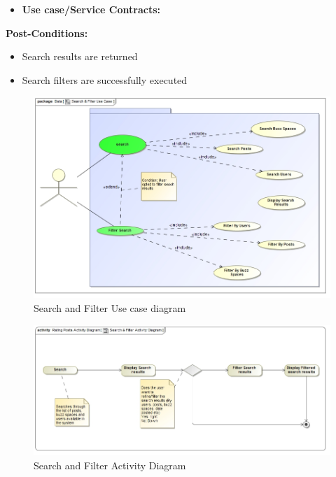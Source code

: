 \documentclass[11pt]{article}
\begin{document}
\begin{enumerate}
\begin{itemize}
\item \textbf{Use case/Service Contracts: } \newline \newline
\end{itemize}
	  \textbf{Post-Conditions: }
	   
	  \begin{itemize}
	  \item Search results are returned
	  \item	Search filters are successfully executed
	  \end{itemize}
	  \graphicspath{ {../Diagrams/Sphe/Search&Filter/} }
	  \begin{figure}[H]	
    	\includegraphics[scale=0.5]{UseCase.jpg}
    	\caption{Search and Filter Use case diagram}
	\end{figure}
	
	\graphicspath{ {../Diagrams/Sphe/Search&Filter/} }
	  \begin{figure}[H]	
    	\includegraphics[scale=0.5]{ActivityDiagram.jpg}
    	\caption{Search and Filter Activity Diagram}
	\end{figure}
	

\end{enumerate}
\end{document}

